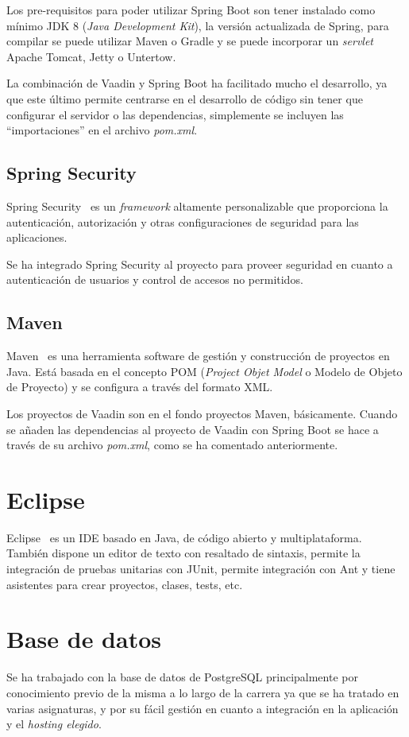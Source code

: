 Los pre-requisitos para poder utilizar Spring Boot son tener instalado como mínimo JDK 8 (\textit{Java Development Kit}), la versión actualizada de Spring, para compilar se puede utilizar Maven o Gradle y se puede incorporar un \textit{servlet} Apache Tomcat, Jetty o Untertow.

La combinación de Vaadin y Spring Boot ha facilitado mucho el desarrollo, ya que este último permite centrarse en el desarrollo de código sin tener que configurar el servidor o las dependencias, simplemente se incluyen las ``importaciones'' en el archivo \textit{pom.xml}.

\subsection{Spring Security}
Spring Security~\cite{pagina_spring_security} es un \textit{framework} altamente personalizable que proporciona la autenticación, autorización y otras configuraciones de seguridad para las aplicaciones.

Se ha integrado Spring Security al proyecto para proveer seguridad en cuanto a autenticación de usuarios y control de accesos no permitidos.

\subsection{Maven}
Maven~\cite{pagina_maven} es una herramienta software de gestión y construcción de proyectos en Java. Está basada en el concepto POM (\textit{Project Objet Model} o Modelo de Objeto de Proyecto) y se configura a través del formato XML.

Los proyectos de Vaadin son en el fondo proyectos Maven, básicamente. Cuando se añaden las dependencias al proyecto de Vaadin con Spring Boot se hace a través de su archivo \textit{pom.xml}, como se ha comentado anteriormente.

\section{Eclipse}
Eclipse~\cite{pagina_eclipse} es un IDE basado en Java, de código abierto y multiplataforma. También dispone un editor de texto con resaltado de sintaxis, permite la integración de pruebas unitarias con JUnit, permite integración con Ant y tiene asistentes para crear proyectos, clases, tests, etc.

\section{Base de datos}
Se ha trabajado con la base de datos de PostgreSQL principalmente por conocimiento previo de la misma a lo largo de la carrera ya que se ha tratado en varias asignaturas, y por su fácil gestión en cuanto a integración en la aplicación y el \textit{hosting elegido}. 

